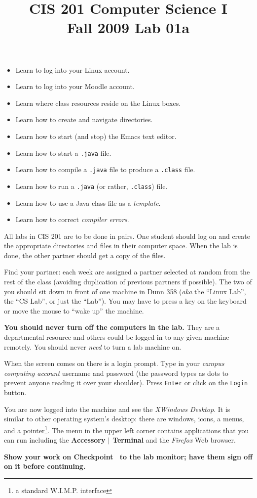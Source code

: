 \documentclass[12pt,twoside]{memoir}
\title{CIS 201 Computer Science I\\Fall 2009 Lab #1}%
\newcommand{\lab}[1]{%
\title{CIS 201 Computer Science I\\Fall 2009 Lab #1}%
\maketitle%
}
\begin{document}
\lab{01a}

\begin{itemize}
\item Learn to log into your Linux account.
\item Learn to log into your Moodle account.
\end{itemize}
{\color{templategrey}
\begin{itemize}
\item Learn where class resources reside on the Linux boxes.
\item Learn how to create and navigate directories.
\item Learn how to start (and stop) the Emacs text editor.
\item Learn how to start a \texttt{.java} file.
\item Learn how to compile a \texttt{.java} file to produce a
  \texttt{.class} file.
\item Learn how to run a \texttt{.java} (or rather, \texttt{.class}) file.
\item Learn how to use a Java class file as a \emph{template}.
\item Learn how to correct \emph{compiler errors}.
\end{itemize}
}

\begin{Exercise}[name={Checkpoint},title={Log into your Linux account.}]

  All labs in CIS 201 are to be done in pairs. One student should log
  on and create the appropriate directories and files in their
  computer space. When the lab is done, the other partner should get a
  copy of the files.

  Find your partner: each week are assigned a partner selected
  at random from the rest of the class (avoiding duplication of
  previous partners if possible). The two of you should sit down in
  front of one machine in Dunn 358 (\emph{aka} the ``Linux Lab'', the
  ``CS Lab'', or just the ``Lab''). You may have to press a key on the
  keyboard or move the mouse to ``wake up'' the machine.

  \textbf{You should never turn off the computers in the lab.} They
  are a departmental resource and others could be logged in to any
  given machine remotely. You should never \emph{need} to turn a lab
  machine on.

  When the screen comes on there is a login prompt. Type in your
  \emph{campus computing account} username and password (the password
  types as dots to prevent anyone reading it over your
  shoulder). Press \texttt{Enter} or click on the \texttt{Login} button.

  You are now logged into the machine and see the \emph{XWindows
    Desktop}. It is similar to other operating system's desktop: there
  are windows, icons, a menus, and a pointer\footnote{a standard
    W.I.M.P. interface}. The menu in the upper left corner contains
  applications that you can run including the \textbf{Accessory $|$
    Terminal} and the \emph{Firefox} Web browser.
\end{Exercise}
\noindent
\textbf{Show your work on Checkpoint~\theExercise{} to the lab monitor;
  have them sign off on it before continuing.}
\end{document}
